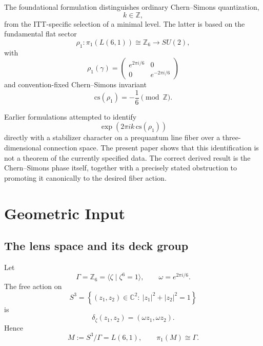 \documentclass[11pt,a4paper]{article}
\begin{document}
The foundational formulation distinguishes ordinary Chern--Simons quantization,
\begin{equation}
k\in\mathbb Z,
\end{equation}
from the ITT-specific selection of a minimal level. The latter is based on the fundamental flat sector
\begin{equation}
\rho_1:\pi_1(L(6,1))\cong\mathbb Z_6\longrightarrow SU(2),
\end{equation}
with
\begin{equation}
\rho_1(\gamma)=
\begin{pmatrix}
 e^{2\pi i/6}&0\\
 0&e^{-2\pi i/6}
\end{pmatrix}
\end{equation}
and convention-fixed Chern--Simons invariant
\begin{equation}
\mathrm{cs}(\rho_1)=-\frac16\pmod{\mathbb Z}.
\end{equation}

Earlier formulations attempted to identify
\begin{equation}
\exp\left(2\pi i k\,\mathrm{cs}(\rho_1)\right)
\end{equation}
directly with a stabilizer character on a prequantum line fiber over a three-dimensional connection space. The present paper shows that this identification is not a theorem of the currently specified data. The correct derived result is the Chern--Simons phase itself, together with a precisely stated obstruction to promoting it canonically to the desired fiber action.

\section{Geometric Input}

\subsection{The lens space and its deck group}

Let
\begin{equation}
\Gamma=\mathbb Z_6=\langle\zeta\mid\zeta^6=1\rangle,
\qquad
\omega=e^{2\pi i/6}.
\end{equation}
The free action on
\begin{equation}
S^3=\left\{(z_1,z_2)\in\mathbb C^2:\ |z_1|^2+|z_2|^2=1\right\}
\end{equation}
is
\begin{equation}
\delta_\zeta(z_1,z_2)=(\omega z_1,\omega z_2).
\end{equation}
Hence
\begin{equation}
M:=S^3/\Gamma=L(6,1),
\qquad
\pi_1(M)\cong\Gamma.
\end{equation}
\end{document}

